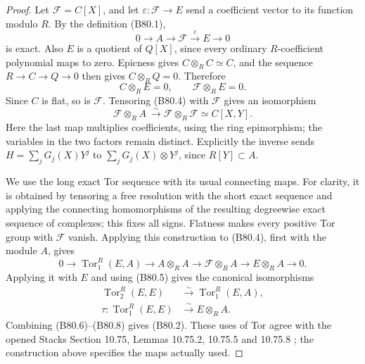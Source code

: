\begin{proof}
Let $\mathcal F=C[X]$, and let
$\varepsilon:\mathcal F\to E$ send a coefficient vector to its
function modulo $R$. By the definition (B80.1),
\[
                0\longrightarrow A\longrightarrow\mathcal F
                    \xrightarrow{\varepsilon}E\longrightarrow0
                                                        \tag{B80.4}
\]
is exact. Also $E$ is a quotient of $Q[X]$, since every ordinary
$R$-coefficient polynomial maps to zero. Epicness gives
$C\otimes_R C\simeq C$, and the sequence $R\to C\to Q\to0$ then
gives $C\otimes_R Q=0$. Therefore
\[
 C\otimes_R E=0,\qquad \mathcal F\otimes_R E=0.           \tag{B80.5}
\]
Since $C$ is flat, so is $\mathcal F$. Tensoring (B80.4) with
$\mathcal F$ gives an isomorphism
\[
 \mathcal F\otimes_R A\ \xrightarrow{\sim}
 \mathcal F\otimes_R\mathcal F\simeq C[X,Y].             \tag{B80.6}
\]
Here the last map multiplies coefficients, using the ring epimorphism;
the variables in the two factors remain distinct. Explicitly the inverse
sends $H=\sum_j G_j(X)Y^j$ to $\sum_jG_j(X)\otimes Y^j$, since
$R[Y]\subset A$.

We use the long exact Tor sequence with its usual connecting maps.
For clarity, it is obtained by tensoring a free resolution with the
short exact sequence and applying the connecting homomorphisms of the
resulting degreewise exact sequence of complexes; this fixes all signs.
Flatness makes every positive Tor group with $\mathcal F$ vanish.
Applying this construction to (B80.4), first with the module $A$,
gives
\[
 0\longrightarrow\operatorname{Tor}_1^R(E,A)
 \longrightarrow A\otimes_R A
 \longrightarrow\mathcal F\otimes_R A
 \longrightarrow E\otimes_R A\longrightarrow0.          \tag{B80.7}
\]
Applying it with $E$ and using (B80.5) gives the canonical isomorphisms
\[
\begin{aligned}
 \operatorname{Tor}_2^R(E,E)&\xrightarrow{\sim}
                         \operatorname{Tor}_1^R(E,A),\\
 \tau:\operatorname{Tor}_1^R(E,E)&\xrightarrow{\sim}E\otimes_R A.
\end{aligned}                                           \tag{B80.8}
\]
Combining (B80.6)--(B80.8) gives (B80.2). These uses of Tor agree
with the opened Stacks Section 10.75, Lemmas 10.75.2, 10.75.5 and
10.75.8 \cite{StacksTor}; the construction above specifies the maps actually used.


\end{proof}
